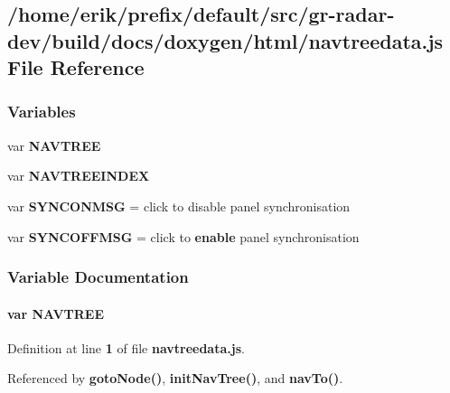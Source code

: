 \subsection{/home/erik/prefix/default/src/gr-\/radar-\/dev/build/docs/doxygen/html/navtreedata.js File Reference}
\label{navtreedata_8js}
\subsubsection*{Variables}
\begin{DoxyCompactItemize}
\item 
var {\bf N\+A\+V\+T\+R\+EE}
\item 
var {\bf N\+A\+V\+T\+R\+E\+E\+I\+N\+D\+EX}
\item 
var {\bf S\+Y\+N\+C\+O\+N\+M\+SG} = \textquotesingle{}click to disable panel synchronisation\textquotesingle{}
\item 
var {\bf S\+Y\+N\+C\+O\+F\+F\+M\+SG} = \textquotesingle{}click to {\bf enable} panel synchronisation\textquotesingle{}
\end{DoxyCompactItemize}


\subsubsection{Variable Documentation}
\paragraph[{N\+A\+V\+T\+R\+EE}]{\setlength{\rightskip}{0pt plus 5cm}var N\+A\+V\+T\+R\+EE}\label{navtreedata_8js_afc3e53a71ba26a8215797019b9b1451b}


Definition at line {\bf 1} of file {\bf navtreedata.\+js}.



Referenced by {\bf goto\+Node()}, {\bf init\+Nav\+Tree()}, and {\bf nav\+To()}.

